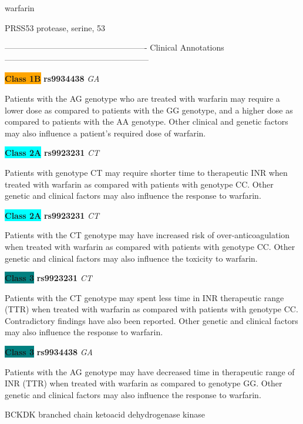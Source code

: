 \documentclass{resume} %
\begin{document}
\begin{rSection}{ warfarin }
\begin{rSubsection}{ PRSS53 }{ protease, serine, 53 }{}{}
\item[] ---------------------------------------------------- Clinical Annotations -----------------------------------------------------\newline
\item \textbf{\colorbox{orange} {Class 1B}} \textbf{ rs9934438 } \textit{ GA }
\item[] Patients with the AG genotype who are treated with warfarin may require a lower dose as compared to patients with the GG genotype, and a higher dose as compared to patients with the AA genotype. Other clinical and genetic factors may also influence a patient’s required dose of warfarin. \item \textbf{\colorbox{cyan} {Class 2A}} \textbf{ rs9923231 } \textit{ CT }
\item[] Patients with genotype CT may require shorter time to therapeutic INR when treated with warfarin as compared with patients with genotype CC. Other genetic and clinical factors may also influence the response to warfarin. \item \textbf{\colorbox{cyan} {Class 2A}} \textbf{ rs9923231 } \textit{ CT }
\item[] Patients with the CT genotype may have increased risk of over-anticoagulation when treated with warfarin as compared with patients with genotype CC. Other genetic and clinical factors may also influence the toxicity to warfarin.\item \textbf{\colorbox{teal} {Class 3}} \textbf{ rs9923231 } \textit{ CT }
\item[] Patients with the CT genotype may spent less time in INR therapeutic range (TTR) when treated with warfarin as compared with patients with genotype CC. Contradictory findings have also been reported. Other genetic and clinical factors may also influence the response to warfarin.\item \textbf{\colorbox{teal} {Class 3}} \textbf{ rs9934438 } \textit{ GA }
\item[] Patients with the AG genotype may have decreased time in therapeutic range of INR (TTR) when treated with warfarin as compared to genotype GG. Other genetic and clinical factors may also influence the response to warfarin.
\end{rSubsection}\begin{rSubsection}{ BCKDK }{ branched chain ketoacid dehydrogenase kinase }{}{}
\item[]


\end{rSubsection}
\end{rSection}
\end{document}
